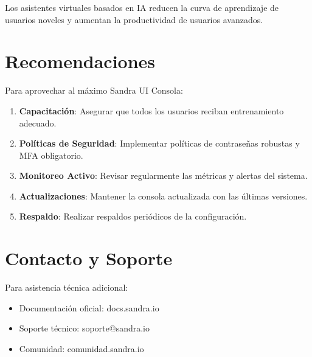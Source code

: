 Los asistentes virtuales basados en IA reducen la curva de aprendizaje de usuarios noveles y aumentan la productividad de usuarios avanzados.

\section{Recomendaciones}

Para aprovechar al máximo Sandra UI Consola:

\begin{enumerate}
    \item \textbf{Capacitación}: Asegurar que todos los usuarios reciban entrenamiento adecuado.
    \item \textbf{Políticas de Seguridad}: Implementar políticas de contraseñas robustas y MFA obligatorio.
    \item \textbf{Monitoreo Activo}: Revisar regularmente las métricas y alertas del sistema.
    \item \textbf{Actualizaciones}: Mantener la consola actualizada con las últimas versiones.
    \item \textbf{Respaldo}: Realizar respaldos periódicos de la configuración.
\end{enumerate}

\section{Contacto y Soporte}

Para asistencia técnica adicional:

\begin{itemize}
    \item Documentación oficial: docs.sandra.io
    \item Soporte técnico: soporte@sandra.io
    \item Comunidad: comunidad.sandra.io
\end{itemize}

\clearpage
